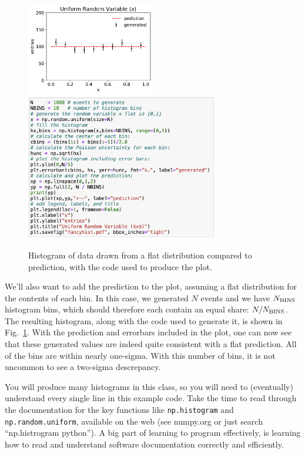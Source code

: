 \begin{figure}[htbp]
 \begin{center}
  \includegraphics[width=0.50\textwidth]{figs/labs/monte_carlo/fancyhist.pdf}
  \includegraphics[width=0.75\textwidth]{figs/labs/monte_carlo/fancyhist-code.png}
\caption{Histogram of data drawn from a flat distribution compared to prediction, with the code used to produce the plot.}
\label{fig:fancyhist}
\end{center}
\end{figure}

We'll also want to add the prediction to the plot, assuming a flat
distribution for the contents of each bin.  In this case, we generated
$N$ events and we have $N_{\rm BINS}$ histogram bins, which should
therefore each contain an equal share: $N / N_{\rm BINS}$.  The
resulting histogram, along with the code used to generate it, is shown
in Fig.~\ref{fig:fancyhist}.  With the prediction and errorbars
included in the plot, one can now see that these generated values are
indeed quite consistent with a flat prediction. All of the bins are
within nearly one-sigma. With this number of bins, it is not uncommon
to see a two-sigma descrepancy.

You will produce many histograms in this class, so you will need to
(eventually) understand every single line in this example code.  Take
the time to read through the documentation for the key functions like
{\tt np.histogram} and {\tt np.random.uniform}, available on the web
(see numpy.org or just search ``np.histrogram python'').  A big part
of learning to program effectively, is learning how to read and
understand software documentation correctly and efficiently.

